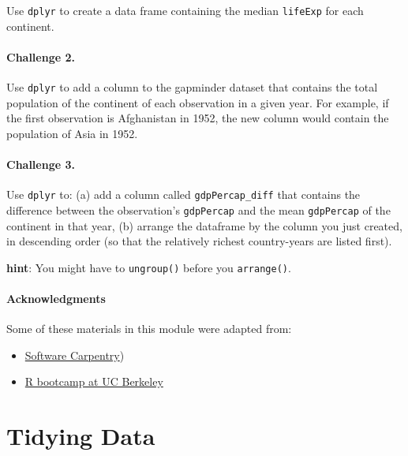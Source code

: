 \documentclass[]{book}
\providecommand{\tightlist}{%
  \setlength{\itemsep}{0pt}\setlength{\parskip}{0pt}}
\begin{document}
Use \texttt{dplyr} to create a data frame containing the median \texttt{lifeExp} for each continent.

\hypertarget{challenge-2.-6}{%
\subsubsection*{Challenge 2.}\label{challenge-2.-6}}

Use \texttt{dplyr} to add a column to the gapminder dataset that contains the total population of the continent of each observation in a given year. For example, if the first observation is Afghanistan in 1952, the new column would contain the population of Asia in 1952.

\hypertarget{challenge-3.-4}{%
\subsubsection*{Challenge 3.}\label{challenge-3.-4}}

Use \texttt{dplyr} to: (a) add a column called \texttt{gdpPercap\_diff} that contains the difference between the observation's \texttt{gdpPercap} and the mean \texttt{gdpPercap} of the continent in that year, (b) arrange the dataframe by the column you just created, in descending order (so that the relatively richest country-years are listed first).

\textbf{hint}: You might have to \texttt{ungroup()} before you \texttt{arrange()}.

\hypertarget{acknowledgments-3}{%
\subsubsection*{Acknowledgments}\label{acknowledgments-3}}

Some of these materials in this module were adapted from:

\begin{itemize}
\tightlist
\item
  \href{http://swcarpentry.github.io/r-novice-gapminder/}{Software Carpentry})
\item
  \href{https://github.com/berkeley-scf/r-bootcamp-fall-2019}{R bootcamp at UC Berkeley}
\end{itemize}

\hypertarget{tidying-data}{%
\chapter{Tidying Data}\label{tidying-data}}
\end{document}
